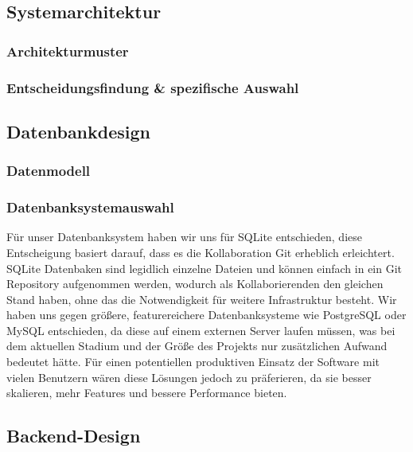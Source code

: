 \documentclass[../main.tex]{subfiles} %
\begin{document}
\subsection{Systemarchitektur} %

\subsubsection{Architekturmuster}

\subsubsection{Entscheidungsfindung \& spezifische Auswahl}

\subsection{Datenbankdesign} %

\subsubsection{Datenmodell}

\subsubsection{Datenbanksystemauswahl}
Für unser Datenbanksystem haben wir uns für SQLite entschieden, diese Entscheigung basiert darauf, dass es die Kollaboration
Git erheblich erleichtert. SQLite Datenbaken sind legidlich einzelne Dateien und können einfach in ein Git Repository aufgenommen werden,
wodurch als Kollaborierenden den gleichen Stand haben, ohne das die Notwendigkeit für weitere Infrastruktur besteht. 
Wir haben uns gegen größere, featurereichere Datenbanksysteme wie PostgreSQL oder MySQL entschieden, da diese auf einem externen Server laufen müssen,
was bei dem aktuellen Stadium und der Größe des Projekts nur zusätzlichen Aufwand bedeutet hätte.
Für einen potentiellen produktiven Einsatz der Software mit vielen Benutzern wären diese Lösungen jedoch zu präferieren, da sie besser skalieren, mehr Features
und bessere Performance bieten.

\subsection{Backend-Design} %

\end{document}
